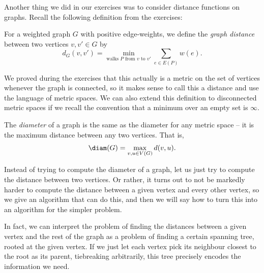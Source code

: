 \documentclass[nobib]{tufte-handout}
\begin{document}
Another thing we did in our exercises was to consider distance functions on graphs. Recall the following definition from the exercises:

\begin{definition}
  For a weighted graph $G$ with positive edge-weights, we define the \emph{graph distance} between two vertices $v, v' \in G$ by
  $$d_G(v, v') = \min_{\text{walks }P\text{ from }v\text{ to }v'} \sum_{e \in E(P)} w(e).$$
\end{definition}

We proved during the exercises that this actually is a metric on the set of vertices whenever the graph is connected, so it makes sense to call this a distance and use the language of metric spaces. We can also extend this definition to disconnected metric spaces if we recall the convention that a minimum over an empty set is $\infty$.

\begin{definition}
  The \emph{diameter} of a graph is the same as the diameter for any metric space -- it is the maximum distance between any two vertices. That is,
  $$\diam(G) = \max_{v, u \in V(G)} d(v,u).$$
\end{definition}

Instead of trying to compute the diameter of a graph, let us just try to compute the distance between two vertices. Or rather, it turns out to not be markedly harder to compute the distance between a given vertex and every other vertex, so we give an algorithm that can do this, and then we will say how to turn this into an algorithm for the simpler problem.

In fact, we can interpret the problem of finding the distances between a given vertex and the rest of the graph as a problem of finding a certain spanning tree, rooted at the given vertex. If we just let each vertex pick its neighbour closest to the root as its parent, tiebreaking arbitrarily, this tree precisely encodes the information we need.
\end{document}
